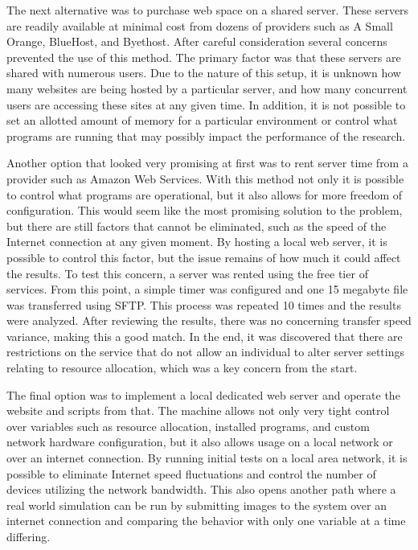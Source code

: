The next alternative was to purchase web space on a shared server. These servers are readily available at minimal cost from dozens of providers such as A Small Orange, BlueHost, and Byethost. After careful consideration several concerns prevented the use of this method. The primary factor was that these servers are shared with numerous users. Due to the nature of this setup, it is unknown how many websites are being hosted by a particular server, and how many concurrent users are accessing these sites at any given time. In addition, it is not possible to set an allotted amount of memory for a particular environment or control what programs are running that may possibly impact the performance of the research.

Another option that looked very promising at first was to rent server time from a provider such as Amazon Web Services. With this method not only it is possible to control what programs are operational, but it also allows for more freedom of configuration. This would seem like the most promising solution to the problem, but there are still factors that cannot be eliminated, such as the speed of the Internet connection at any given moment. By hosting a local web server, it is possible to control this factor, but the issue remains of how much it could affect the results. To test this concern, a server was rented using the free tier of services. From this point, a simple timer was configured and one 15 megabyte file was transferred using SFTP. This process was repeated 10 times and the results were analyzed. After reviewing the results, there was no concerning transfer speed variance, making this a good match. In the end, it was discovered that there are restrictions on the service that do not allow an individual to alter server settings relating to resource allocation, which was a key concern from the start.

The final option was to implement a local dedicated web server and operate the website and scripts from that. The machine allows not only very tight control over variables such as resource allocation, installed programs, and custom network hardware configuration, but it also allows usage on a local network or over an internet connection. By running initial tests on a local area network, it is possible to eliminate Internet speed fluctuations and control the number of devices utilizing the network bandwidth. This also opens another path where a real world simulation can be run by submitting images to the system over an internet connection and comparing the behavior with only one variable at a time differing.

